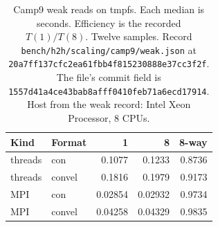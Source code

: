 \begin{table}[tbp]
\centering
\scriptsize
\caption{Camp9 weak reads on tmpfs. Each median is seconds. Efficiency is the recorded $T(1)/T(8)$. Twelve samples. Record \texttt{bench/h2h/scaling/camp9/weak.json} at \texttt{20a7ff137cfc2ea61fbb4f815230888e37cc3f2f}. The file's commit field is \texttt{1557d41a4ce43bab8afff0410feb71a6ecd17914}. Host from the weak record: Intel Xeon Processor, 8 CPUs.}
\label{tab:camp9-weak-read}
\begin{tabular}{@{}llrrr@{}}
\toprule
Kind & Format & 1 & 8 & 8-way \\
\midrule
threads & con & 0.1077 & 0.1233 & 0.8736 \\
threads & convel & 0.1816 & 0.1979 & 0.9173 \\
MPI & con & 0.02854 & 0.02932 & 0.9734 \\
MPI & convel & 0.04258 & 0.04329 & 0.9835 \\
\bottomrule
\end{tabular}
\end{table}

\begin{table}[tbp]
\centering
\scriptsize
\caption{Camp9 eight-worker write split. Format, copy and the write are the recorded medians in seconds. Residual is the recorded sum overhead, the write minus format minus copy. The store is the one the summary marks as matched. Record \texttt{bench/h2h/scaling/camp9/summary.json} at \texttt{20a7ff137cfc2ea61fbb4f815230888e37cc3f2f}. Host from the weak record: Intel Xeon Processor, 8 CPUs.}
\label{tab:camp9-write-split}
\end{table}
